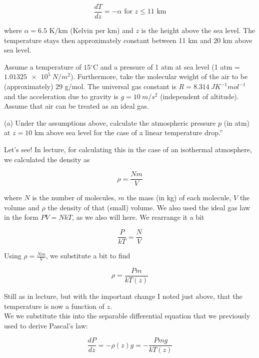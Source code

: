 \documentclass[8.01x]{subfiles}
\begin{document}
\begin{equation}
\frac{dT}{dz} = -\alpha \text{ for } z \le 11 \text{ km}
\end{equation}

where $\alpha = 6.5$ K/km (Kelvin per km) and $z$ is the height above the sea level. The temperature stays then approximately constant between 11 km and 20 km above sea level.

Assume a temperature of $15{}^\circ$C and a pressure of 1 atm at sea level (1 atm = $\SI{1.01325e5}{N/m^2}$). Furthermore, take the molecular weight of the air to be (approximately) 29 g/mol. The universal gas constant is $R = \SI{8.314}{J K^{-1} mol^{-1}}$ and the acceleration due to gravity is $g = \SI{10}{m/s^2}$ (independent of altitude). Assume that air can be treated as an ideal gas.

(a) Under the assumptions above, calculate the atmospheric pressure $p$ (in atm) at $z = 10$ km above sea level for the case of a linear temperature drop.''

Let's see! In lecture, for calculating this in the case of an isothermal atmosphere, we calculated the density as

\begin{equation}
\rho = \frac{N m}{V}
\end{equation}

where $N$ is the number of molecules, $m$ the mass (in kg) of each molecule, $V$ the volume and $\rho$ the density of that (small) volume. We also used the ideal gas law in the form $P V = N k T$, as we also will here. We rearrange it a bit

\begin{equation}
\frac{P}{kT} = \frac{N}{V}
\end{equation}

Using $\rho = \frac{N m}{V}$, we substitute a bit to find

\begin{equation}
\rho=\frac{P m}{k T(z)}
\end{equation}

Still as in lecture, but with the important change I noted just above, that the temperature is now a function of $z$.\\
We we substitute this into the separable differential equation that we previously used to derive Pascal's law:

\begin{equation}
\frac{dP}{dz} = - \rho(z) g = - \frac{P mg}{k T(z)}
\end{equation}
\end{document}
